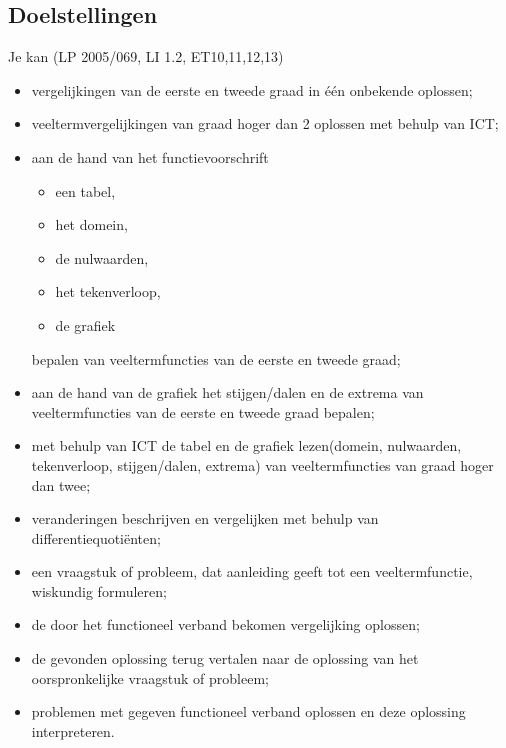 \documentclass[12pt]{article}
\begin{document}
\subsection*{Doelstellingen}
{\singlespacing

Je kan \hfill  {\scriptsize(LP 2005/069, LI 1.2, ET10,11,12,13)}
\begin{itemize}
  \item vergelijkingen van de eerste en tweede graad in één onbekende oplossen;
  \item veeltermvergelijkingen van graad hoger dan 2 oplossen met behulp van ICT;
  \item aan de hand van het functievoorschrift
        \begin{itemize}
          \item een tabel,
          \item het domein,
          \item de nulwaarden,
          \item het tekenverloop,
          \item de grafiek
        \end{itemize}
        bepalen van veeltermfuncties van de eerste en tweede graad;
  \item aan de hand van de grafiek het stijgen/dalen en de extrema van veeltermfuncties van de eerste en tweede graad bepalen;
  \item met behulp van ICT de tabel en de grafiek lezen(domein, nulwaarden, tekenverloop, stijgen/dalen, extrema) van veeltermfuncties van graad hoger dan twee;
  \item veranderingen beschrijven en vergelijken met behulp van differentiequotiënten;
  \item een vraagstuk of probleem, dat aanleiding geeft tot een veeltermfunctie, wiskundig formuleren;
  \item de door het functioneel verband bekomen vergelijking oplossen;
  \item de gevonden oplossing terug vertalen naar de oplossing van het oorspronkelijke vraagstuk of probleem;
  \item problemen met gegeven functioneel verband oplossen en deze oplossing interpreteren.
\end{itemize}

}
\thispagestyle{empty}
\mbox{}
\newpage
\clearpage
\thispagestyle{empty}
\mbox{}
\newpage
\clearpage
{} 


\fancyhead[RE,LO]{}
\end{document}
